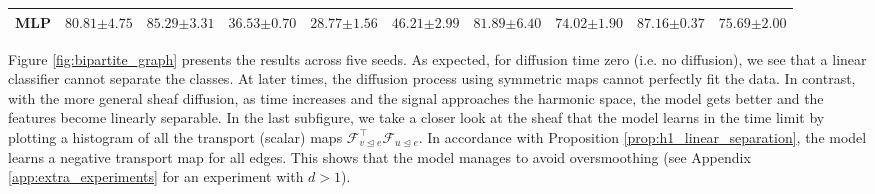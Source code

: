 \documentclass{article}
\def\gF{{\mathcal{F}}}
\newcommand{\tleq}{\trianglelefteq}
\begin{document}
\begin{table*}[t]
{\begin{tabular}{l ccccccccc}
         MLP &
         $80.81 {\scriptstyle \pm 4.75}$ &
         $85.29 {\scriptstyle \pm 3.31}$ &
         $36.53 {\scriptstyle \pm 0.70}$ & 
         $28.77 {\scriptstyle \pm 1.56}$ & 
         $46.21 {\scriptstyle \pm 2.99}$ &
         $81.89 {\scriptstyle \pm 6.40}$ &
         $74.02 {\scriptstyle \pm 1.90}$ &
         $87.16 {\scriptstyle \pm 0.37}$ &
         $75.69 {\scriptstyle \pm 2.00}$ \\ 














         \bottomrule
         
    \end{tabular}
    }
    \vspace{-12pt}
    \label{tab:main_results}
\end{table*} 

Figure \ref{fig:bipartite_graph} presents the results across five seeds. As expected, for diffusion time zero (i.e. no diffusion), we see that a linear classifier cannot separate the classes. At later times, the diffusion process using symmetric maps cannot perfectly fit the data. In contrast, with the more general sheaf diffusion, as time increases and the signal approaches the harmonic space, the model gets better and the features become linearly separable. In the last subfigure, we take a closer look at the sheaf that the model learns in the time limit by plotting a histogram of all the transport (scalar) maps $\gF_{v \tleq e}^\top\gF_{u \tleq e}$. In accordance with Proposition \ref{prop:h1_linear_separation}, the model learns a negative transport map for all edges. This shows that the model manages to avoid oversmoothing (see Appendix \ref{app:extra_experiments} for an experiment with $d > 1$). \vspace{-5pt}
\end{document}
